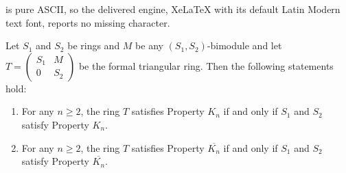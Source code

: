 \documentclass[10pt,a4paper]{amsart}
\begin{document}
is pure ASCII, so the delivered engine, XeLaTeX with its default Latin Modern text font, reports no missing character.
\begin{theorem}\label{THM: Property Kn for triangular matrix rings}
    Let $S_1$ and $S_2$ be  rings and $M$ be any $(S_1,S_2)$-bimodule and let $T=\begin{pmatrix}
            S_1&M\\
            0&S_2
        \end{pmatrix}$  be the formal triangular ring. Then the following statements hold:
    \begin{enumerate}
        \item For any $n \geq 2$, the ring $T$ satisfies Property $K_n$ if and only if $S_1$ and $S_2$ satisfy Property $K_n$. 
        \item For any $n \geq 2$, the ring $T$ satisfies Property $\overline{K_n}$ if and only if $S_1$ and $S_2$ satisfy Property $\overline{K_n}$. 
    \end{enumerate}
    \end{theorem}
\end{document}
